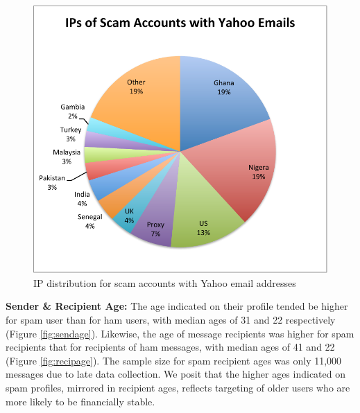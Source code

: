 \documentclass[preprint]{acm_proc_article-sp}
\begin{document}
\begin{figure}[h]
    \centering
    \includegraphics[width=\linewidth]{figures/yahoo-spam.pdf}
    \caption{IP distribution for scam accounts with Yahoo email addresses}
    \label{fig:yspam}
\end{figure}

\textbf{Sender \& Recipient Age:} The age indicated on their profile tended be higher for spam user than 
for ham users, with median ages of 31 and 22 respectively (Figure \ref{fig:sendage}). Likewise, the 
age of message recipients was higher for spam recipients that for recipients of ham messages, with 
median ages of 41 and 22 (Figure \ref{fig:recipage}). The sample size for spam recipient ages 
was only 11,000 messages due to late data collection. We posit that the higher ages indicated on spam profiles, 
mirrored in recipient ages, reflects targeting of older users who are more likely to be financially 
stable. 
\end{document}
